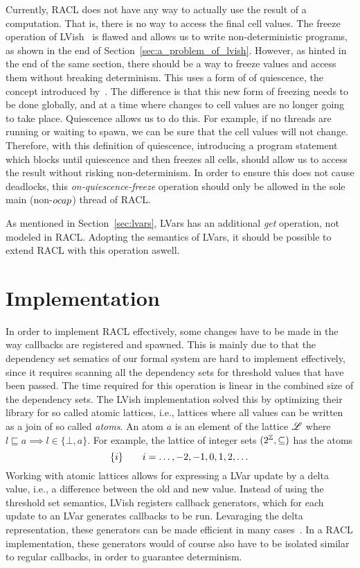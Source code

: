 Currently, RACL does not have any way to actually use the result of a
computation. That is, there is no way to access the final cell values. The
freeze operation of LVish~\parencite{kuper2014freeze} is flawed and allows us to
write non-deterministic programs, as shown in the end of
Section~\ref{sec:a_problem_of_lvish}. However, as hinted in the end of the same
section, there should be a way to freeze values and access them without breaking
determinism.  This uses a form of of quiescence, the concept introduced
by~\textcite{kuper2014freeze}. The difference is that this new form of freezing
needs to be done globally, and at a time where changes to cell values are no
longer going to take place. Quiescence allows us to do this. For example, if no
threads are running or waiting to spawn, we can be sure that the cell values
will not change. Therefore, with this definition of quiescence, introducing a
program statement which blocks until quiescence and then freezes all cells,
should allow us to access the result without risking non-determinism. In order
to ensure this does not cause deadlocks, this \emph{on-quiescence-freeze}
operation should only be allowed in the sole main (non-$\mbox{$ocap$}$) thread of RACL.

As mentioned in Section~\ref{sec:lvars}, LVars has an additional \emph{get}
operation, not modeled in RACL. Adopting the semantics of LVars, it should be
possible to extend RACL with this operation aswell.

\section{Implementation}%
\label{sec:implementation}

In order to implement RACL effectively, some changes have to be made in the way
callbacks are registered and spawned. This is mainly due to that the dependency
set sematics of our formal system are hard to implement effectively, since it
requires scanning all the dependency sets for threshold values that have been
passed. The time required for this operation is linear in the combined size of
the dependency sets.  The LVish implementation solved this by optimizing their
library for so called atomic lattices, i.e., lattices where all values can be
written as a join of so called \emph{atoms}. An atom $a$ is an element of the
lattice $\mbox{$\mathscr{L}$}$ where $l \sqsubseteq a \implies l \in \{\bot, a\}$. For
example, the lattice of integer sets $(2^{\mathbb{Z}}, \subseteq)$ has the atoms
\begin{equation*}
  \{ i \} \quad\quad i = \dots, -2, -1, 0, 1, 2,\dots
\end{equation*}
Working with atomic lattices allows for expressing a LVar update by a delta
value, i.e., a difference between the old and new value. Instead of using the
threshold set semantics, LVish registers callback generators, which for each
update to an LVar generates callbacks to be run. Levaraging the delta
representation, these generators can be made efficient in many
cases~\parencite{kuper2014freeze}. In a RACL implementation, these generators
would of course also have to be isolated similar to regular callbacks, in
order to guarantee determinism.


